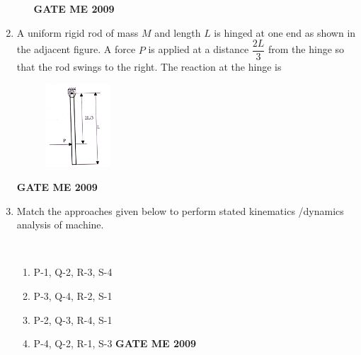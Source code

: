 \documentclass[journal]{IEEEtran}
\begin{document}
\begin{enumerate}[leftmargin=0pt]
\begin{enumerate}
\hfill{\textbf{GATE ME 2009}}
\end{enumerate}





\item A uniform rigid rod of mass $M$ and length $L$ is hinged at one end as shown in the adjacent figure. A force $P$ is applied at a distance $\dfrac{2L}{3}$ from the hinge so that the rod swings to the right. The reaction at the hinge is
\begin{figure}[h]
  \centering
  \includegraphics[width=0.23\textwidth]{Figs/image (10).png}
  \caption{}
\end{figure}
\begin{enumerate}
\hfill{\textbf{GATE ME 2009}}
\end{enumerate}
\item Match the approaches given below to perform stated kinematics /dynamics analysis of machine.\\
\begin{table}[h]
    \centering
    
\end{table}\\

\begin{enumerate}
  \item P-1, Q-2, R-3, S-4
  \item P-3, Q-4, R-2, S-1
  \item P-2, Q-3, R-4, S-1
  \item P-4, Q-2, R-1, S-3
\hfill{\textbf{GATE ME 2009}}
\end{enumerate}


\end{enumerate}
\end{document}
